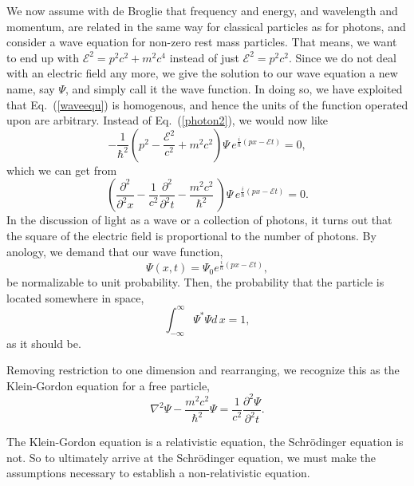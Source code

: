 \documentclass[preprint,footinbib,preprintnumbers,amsmath,amssymb,prb,12pt]{revtex4}
\begin{document}
We now assume with de Broglie that frequency and energy, and
wavelength and momentum, are related in the same way for classical
particles as for photons, and consider a wave equation for non-zero
rest mass particles. That means, we want to end up with
$\mathcal{E}^2=p^2c^2+m^2c^4$ instead of just
$\mathcal{E}^2=p^2c^2$. Since we do not deal with an electric field
any more, we give the solution to our wave equation a new name, say
$\Psi$, and simply call it the wave function. In doing so, we have exploited that Eq.~(\ref{waveequ}) is homogenous, and hence the units of the function operated upon are arbitrary. Instead of
Eq.~(\ref{photon2}), we would now like
\begin{equation}
-\frac{1}{\hbar^2}\left(p^2-\frac{\mathcal{E}^2}{c^2}+m^2c^2\right)\Psi\,e^{\frac{i}{\hbar}(px-\mathcal{E}
t)}=0,
\end{equation}
which we can get from
\begin{equation}
\left(\frac{\partial^2}{\partial^2x}-\frac{1}{c^2}\frac{\partial^2}{\partial^2t}-\frac{m^2c^2}{\hbar^2}\
\right)\Psi\,e^{\frac{i}{\hbar}(px-\mathcal{E}
t)}=0.\label{kleingordon1D}
\end{equation}
In the discussion of light as a wave or a collection of photons, it
turns out that the square of the electric field is proportional to
the number of photons. By anology, we demand that our wave function,
\begin{equation}
\Psi(x,t)=\Psi_0e^{\frac{i}{\hbar}(px-\mathcal{E} t)},\label{quantsoln}
\end{equation}
be normalizable to unit probability. Then, the probability that the
particle is located somewhere in space,
\begin{equation}
\int_{-\infty}^{\infty}\Psi^*\Psi d\,x=1,
\end{equation}
as it should be.

Removing restriction to one dimension and rearranging, we recognize
this as the Klein-Gordon equation for a free particle,
\begin{equation}
\nabla^2\Psi-\frac{m^2c^2}{\hbar^2}\Psi=\frac{1}{c^2}\frac{\partial^2\Psi}{\partial^2t}.\label{kleingordon}
\end{equation}

The Klein-Gordon equation is a relativistic equation, the
Schr\"{o}dinger equation is not. So to ultimately arrive at the
Schr\"{o}dinger equation, we must make the assumptions necessary to
establish a non-relativistic equation.
\end{document}

